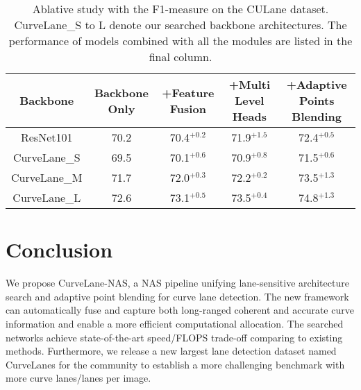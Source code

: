 \documentclass[runningheads]{llncs}
\providecommand{\tabularnewline}{\\}
\begin{document}
\begin{table}[tb]

\caption{\label{tab:Ablative-Study-onNMS}Ablative study with the F1-measure
on the CULane dataset. CurveLane\_S to L denote our searched backbone
architectures. The performance of models combined with all the modules
are listed in the final column.}



\begin{centering}
{\scriptsize{}}\tabcolsep 0.02in{\scriptsize{}}\begin{tabular}{c|c|c|c|c}
\hline 
{\scriptsize{}Backbone} & {\scriptsize{}Backbone Only} & {\scriptsize{}+Feature Fusion} & {\scriptsize{}+Multi Level Heads} & {\scriptsize{}+Adaptive Points Blending}\tabularnewline
\hline 
{\scriptsize{}ResNet101} & {\scriptsize{}70.2} & {\scriptsize{}70.4$^{+0.2}$} & {\scriptsize{}71.9$^{+1.5}$} & {\scriptsize{}72.4$^{+0.5}$}\tabularnewline
{\scriptsize{}CurveLane\_S} & {\scriptsize{}69.5} & {\scriptsize{}70.1$^{+0.6}$} & {\scriptsize{}70.9$^{+0.8}$} & {\scriptsize{}71.5$^{+0.6}$}\tabularnewline
{\scriptsize{}CurveLane\_M} & {\scriptsize{}71.7} & {\scriptsize{}72.0$^{+0.3}$} & {\scriptsize{}72.2$^{+0.2}$} & {\scriptsize{}73.5$^{+1.3}$}\tabularnewline
{\scriptsize{}CurveLane\_L} & {\scriptsize{}72.6} & {\scriptsize{}73.1$^{+0.5}$} & {\scriptsize{}73.5$^{+0.4}$} & {\scriptsize{}74.8$^{+1.3}$}\tabularnewline
\hline 
\end{tabular}{\scriptsize\par}
\par\end{centering}

\end{table}


\section{Conclusion}

We propose CurveLane-NAS, a NAS pipeline unifying lane-sensitive architecture
search and adaptive point blending for curve lane detection. The new
framework can automatically fuse and capture both long-ranged coherent
and accurate curve information and enable a more efficient computational
allocation. The searched networks achieve state-of-the-art speed/FLOPS
trade-off comparing to existing methods. Furthermore, we release a
new largest lane detection dataset named CurveLanes for the community
to establish a more challenging benchmark with more curve lanes/lanes per image. 



 
\end{document}
